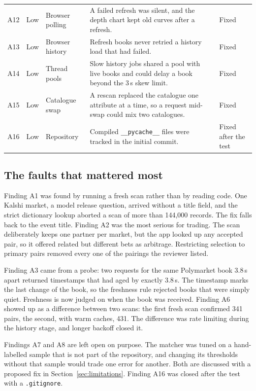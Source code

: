 \documentclass[5p,letterpaper]{elsarticle}
\begin{document}
\begin{table}[t]
\begin{tabularx}{\textwidth}{@{}lllLl@{}}
A12 & Low & Browser polling & A failed refresh was silent, and the depth chart kept old curves after a refresh. & Fixed \\
A13 & Low & Browser history & Refresh books never retried a history load that had failed. & Fixed \\
A14 & Low & Thread pools & Slow history jobs shared a pool with live books and could delay a book beyond the 3\,s skew limit. & Fixed \\
A15 & Low & Catalogue swap & A rescan replaced the catalogue one attribute at a time, so a request mid-swap could mix two catalogues. & Fixed \\
A16 & Low & Repository & Compiled \texttt{\_\_pycache\_\_} files were tracked in the initial commit. & Fixed after the test \\
\bottomrule
\end{tabularx}
\end{table}

\subsection{The faults that mattered most}

Finding A1 was found by running a fresh scan rather than by reading code. One Kalshi market, a model release question, arrived without a title field, and the strict dictionary lookup aborted a scan of more than 144,000 records. The fix falls back to the event title. Finding A2 was the most serious for trading. The scan deliberately keeps one partner per market, but the app looked up any accepted pair, so it offered related but different bets as arbitrage. Restricting selection to primary pairs removed every one of the pairings the reviewer listed.

Finding A3 came from a probe: two requests for the same Polymarket book 3.8\,s apart returned timestamps that had aged by exactly 3.8\,s. The timestamp marks the last change of the book, so the freshness rule rejected books that were simply quiet. Freshness is now judged on when the book was received. Finding A6 showed up as a difference between two scans: the first fresh scan confirmed 341 pairs, the second, with warm caches, 431. The difference was rate limiting during the history stage, and longer backoff closed it.

Findings A7 and A8 are left open on purpose. The matcher was tuned on a hand-labelled sample that is not part of the repository, and changing its thresholds without that sample would trade one error for another. Both are discussed with a proposed fix in Section~\ref{sec:limitations}. Finding A16 was closed after the test with a \texttt{.gitignore}.
\end{document}
